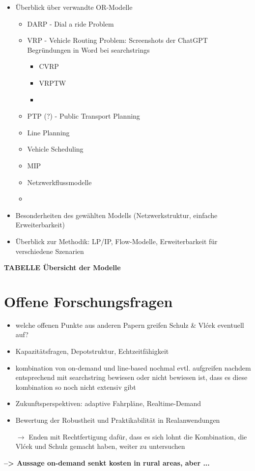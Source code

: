 \begin{itemize}
    \item Überblick über verwandte OR-Modelle
    \begin{itemize}
        \item DARP - Dial a ride Problem
        \item VRP - Vehicle Routing Problem: Screenshots der ChatGPT Begründungen in Word bei searchstrings
        \begin{itemize}
            \item CVRP
            \item VRPTW
            \item 
        \end{itemize}
        \item PTP (?) - Public Transport Planning
        \item Line Planning
        \item Vehicle Scheduling
        \item MIP
        \item Netzwerkflussmodelle
        \item 
    \end{itemize}
    \item Besonderheiten des gewählten Modells (Netzwerkstruktur, einfache Erweiterbarkeit)
    \item Überblick zur Methodik: LP/IP, Flow-Modelle, Erweiterbarkeit für verschiedene Szenarien
\end{itemize}

\begin{center}
    \textbf{TABELLE Übersicht der Modelle}
\end{center}




\section{Offene Forschungsfragen}
\label{sec:2.3}
\label{sec:OffeneForschungsfragen}
\begin{itemize}
    \item welche offenen Punkte aus anderen Papern greifen Schulz \& Vlćek eventuell auf?
    \item Kapazitätsfragen, Depotstruktur, Echtzeitfähigkeit
    \item kombination von on-demand und line-based nochmal evtl. aufgreifen nachdem entsprechend mit searchstring bewiesen oder nicht bewiesen ist, dass es diese kombination so noch nicht extensiv gibt
    \item Zukunftsperspektiven: adaptive Fahrpläne, Realtime-Demand
    \item Bewertung der Robustheit und Praktikabilität in Realanwendungen
    
    $\rightarrow$ Enden mit Rechtfertigung dafür, dass es sich lohnt die Kombination, die Vlćek und Schulz gemacht haben, weiter zu untersuchen
\end{itemize}

\textbf{--> Aussage on-demand senkt kosten in rural areas, aber ...}


